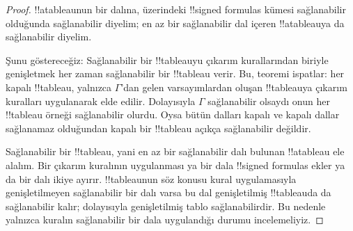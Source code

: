 \documentclass[../../../include/open-logic-section]{subfiles}
\begin{document}
\begin{proof}
!!a{tableau}{}nun bir dalına, üzerindeki !!{signed formula}s kümesi
sağlanabilir olduğunda sağlanabilir diyelim; en az bir sağlanabilir dal içeren
!!a{tableau}{}ya da sağlanabilir diyelim.

Şunu göstereceğiz: Sağlanabilir bir !!{tableau}{}yu çıkarım kurallarından
biriyle genişletmek her zaman sağlanabilir bir !!{tableau} verir. Bu, teoremi
ispatlar: her kapalı !!{tableau}, yalnızca $\Gamma$'dan gelen varsayımlardan
oluşan !!{tableau}{}ya çıkarım kuralları uygulanarak elde edilir. Dolayısıyla
$\Gamma$ sağlanabilir olsaydı onun her !!{tableau} örneği sağlanabilir olurdu.
Oysa bütün dalları kapalı ve kapalı dallar sağlanamaz olduğundan kapalı bir
!!{tableau} açıkça sağlanabilir değildir.

Sağlanabilir bir !!{tableau}, yani en az bir sağlanabilir dalı bulunan
!!a{tableau} ele alalım. Bir çıkarım kuralının uygulanması ya bir dala
!!{signed formula}s ekler ya da bir dalı ikiye ayırır. !!{tableau}{}nun söz
konusu kural uygulamasıyla genişletilmeyen sağlanabilir bir dalı varsa bu dal
genişletilmiş !!{tableau}{}da da sağlanabilir kalır; dolayısıyla genişletilmiş
tablo sağlanabilirdir. Bu nedenle yalnızca kuralın sağlanabilir bir dala
uygulandığı durumu incelemeliyiz.


\end{proof}
\end{document}
